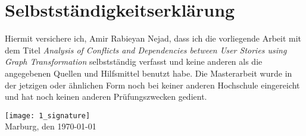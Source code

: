 \section*{Selbstständigkeitserklärung}
Hiermit versichere ich, Amir Rabieyan Nejad, dass ich die vorliegende Arbeit mit dem Titel \emph{Analysis of Conflicts and Dependencies between User Stories using Graph Transformation} selbstständig verfasst und keine anderen als die angegebenen Quellen und Hilfsmittel benutzt habe. Die Masterarbeit wurde in der jetzigen oder ähnlichen Form noch bei keiner anderen Hochschule eingereicht und hat noch keinen anderen Prüfungszwecken gedient.

\begin{flushleft}
\texttt{[image: 1\_signature]}\\
Marburg, den \today
{}
\end{flushleft}






